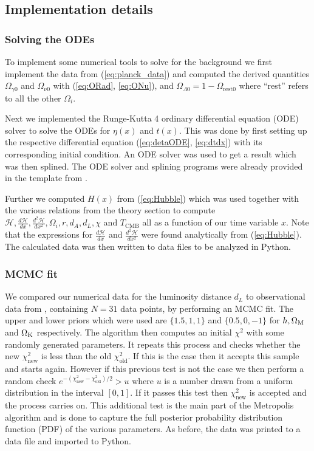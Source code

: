 \documentclass[%
reprint,
 amsmath,amssymb,
 aps,
]{revtex4-2}
\newcommand{\Hp}{\mathcal{H}}
\begin{document}
\subsection{Implementation details}
\subsubsection{Solving the ODEs}
To implement some numerical tools to solve for the background we first implement the data from (\ref{eq:planck_data}) and computed the derived quantities $\Omega_{\gamma0}$ and $\Omega_{\nu0}$ with (\ref{eq:ORad}, \ref{eq:ONu}), and $\Omega_{\Lambda0}=1-\Omega_\text{rest0}$ where ``rest'' refers to all the other $\Omega_i$.  

Next we implemented the Runge-Kutta 4 ordinary differential equation (ODE) solver to solve the ODEs for $\eta(x)$ and $t(x)$. This was done by first setting up the respective differential equation (\ref{eq:detaODE}, \ref{eq:dtdx}) with its corresponding initial condition. An ODE solver was used to get a result which was then splined. The ODE solver and splining programs were already provided in the template from \cite{AST5220LectureNotes}. 

Further we computed $H(x)$ from (\ref{eq:Hubble}) which was used together with the various relations from the theory section to compute $\Hp,\frac{d\Hp}{dx},\frac{d^2\Hp}{dx^2},\Omega_i,r,d_A,d_L,\chi$ and $T_{\text{CMB}}$ all as a function of our time variable $x$. Note that the expressions for $\frac{d\Hp}{dx}$ and $\frac{d^2\Hp}{dx^2}$ were found analytically from (\ref{eq:Hubble}). The calculated data was then written to data files to be analyzed in Python.
\subsubsection{MCMC fit}
We compared our numerical data  for the luminosity distance $d_L$ to observational data from \cite{SDSS:2014iwm}, containing $N=31$ data points, by performing an MCMC fit. The upper and lower priors which were used are $\{1.5,1,1\}$ and $\{0.5,0,-1\}$ for $h, \Omega_{\text M}$ and $\Omega_{\text K}$ respectively. The algorithm then computes an initial $\chi^2$ with some randomly generated parameters. It repeats this process and checks whether the new $\chi^2_\text{new}$ is less than the old $\chi^2_\text{old}$. If this is the case then it accepts this sample and starts again. However if this previous test is not the case we then perform a random check $e^{-(\chi^2_\text{new}-\chi_\text{old}^2)/2}>u$ where $u$ is a number drawn from a uniform distribution in the interval $[0,1]$. If it passes this test then $\chi^2_\text{new}$ is accepted and the process carries on. This additional test is the main part of the Metropolis algorithm and is done to capture the full posterior probability distribution function (PDF) of the various parameters.  As before, the data was printed to a data file and imported to Python.
\end{document}
